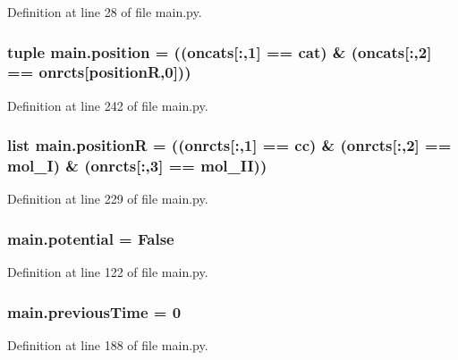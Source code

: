Definition at line 28 of file main.\-py.

\hypertarget{a00122_ac67c60df3cc9afae7e4888d2b48b846d}{
\subsubsection[{position}]{\setlength{\rightskip}{0pt plus 5cm}tuple main.\-position = (({\bf oncats}\mbox{[}\-:,1\mbox{]} == {\bf cat}) \& ({\bf oncats}\mbox{[}\-:,2\mbox{]} == {\bf onrcts}\mbox{[}{\bf position\-R},0\mbox{]}))}}\label{a00122_ac67c60df3cc9afae7e4888d2b48b846d}


Definition at line 242 of file main.\-py.

\hypertarget{a00122_adbbdc0f6ad0f08400b3e492f7a807a6b}{
\subsubsection[{position\-R}]{\setlength{\rightskip}{0pt plus 5cm}list main.\-position\-R = (({\bf onrcts}\mbox{[}\-:,1\mbox{]} == {\bf cc}) \& ({\bf onrcts}\mbox{[}\-:,2\mbox{]} == {\bf mol\-\_\-\-I}) \& ({\bf onrcts}\mbox{[}\-:,3\mbox{]} == {\bf mol\-\_\-\-I\-I}))}}\label{a00122_adbbdc0f6ad0f08400b3e492f7a807a6b}


Definition at line 229 of file main.\-py.

\hypertarget{a00122_abe4c267a63409b1b7cd9c6aaf0779b4a}{
\subsubsection[{potential}]{\setlength{\rightskip}{0pt plus 5cm}main.\-potential = False}}\label{a00122_abe4c267a63409b1b7cd9c6aaf0779b4a}


Definition at line 122 of file main.\-py.

\hypertarget{a00122_a6a6de947e3b6ada5ea6e761d208228bd}{
\subsubsection[{previous\-Time}]{\setlength{\rightskip}{0pt plus 5cm}main.\-previous\-Time = 0}}\label{a00122_a6a6de947e3b6ada5ea6e761d208228bd}


Definition at line 188 of file main.\-py.

